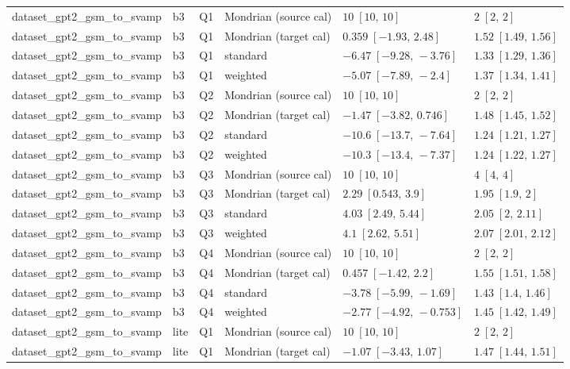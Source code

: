\begin{longtable}{@{}p{}p{}p{}p{}p{}p{}@{}}
dataset\_gpt2\_gsm\_to\_svamp & b3 & Q1 & Mondrian (source cal) & $10\;[10,\,10]$ & $2\;[2,\,2]$ \\
dataset\_gpt2\_gsm\_to\_svamp & b3 & Q1 & Mondrian (target cal) & $0.359\;[-1.93,\,2.48]$ & $1.52\;[1.49,\,1.56]$ \\
dataset\_gpt2\_gsm\_to\_svamp & b3 & Q1 & standard & $-6.47\;[-9.28,\,-3.76]$ & $1.33\;[1.29,\,1.36]$ \\
dataset\_gpt2\_gsm\_to\_svamp & b3 & Q1 & weighted & $-5.07\;[-7.89,\,-2.4]$ & $1.37\;[1.34,\,1.41]$ \\
dataset\_gpt2\_gsm\_to\_svamp & b3 & Q2 & Mondrian (source cal) & $10\;[10,\,10]$ & $2\;[2,\,2]$ \\
dataset\_gpt2\_gsm\_to\_svamp & b3 & Q2 & Mondrian (target cal) & $-1.47\;[-3.82,\,0.746]$ & $1.48\;[1.45,\,1.52]$ \\
dataset\_gpt2\_gsm\_to\_svamp & b3 & Q2 & standard & $-10.6\;[-13.7,\,-7.64]$ & $1.24\;[1.21,\,1.27]$ \\
dataset\_gpt2\_gsm\_to\_svamp & b3 & Q2 & weighted & $-10.3\;[-13.4,\,-7.37]$ & $1.24\;[1.22,\,1.27]$ \\
dataset\_gpt2\_gsm\_to\_svamp & b3 & Q3 & Mondrian (source cal) & $10\;[10,\,10]$ & $4\;[4,\,4]$ \\
dataset\_gpt2\_gsm\_to\_svamp & b3 & Q3 & Mondrian (target cal) & $2.29\;[0.543,\,3.9]$ & $1.95\;[1.9,\,2]$ \\
dataset\_gpt2\_gsm\_to\_svamp & b3 & Q3 & standard & $4.03\;[2.49,\,5.44]$ & $2.05\;[2,\,2.11]$ \\
dataset\_gpt2\_gsm\_to\_svamp & b3 & Q3 & weighted & $4.1\;[2.62,\,5.51]$ & $2.07\;[2.01,\,2.12]$ \\
dataset\_gpt2\_gsm\_to\_svamp & b3 & Q4 & Mondrian (source cal) & $10\;[10,\,10]$ & $2\;[2,\,2]$ \\
dataset\_gpt2\_gsm\_to\_svamp & b3 & Q4 & Mondrian (target cal) & $0.457\;[-1.42,\,2.2]$ & $1.55\;[1.51,\,1.58]$ \\
dataset\_gpt2\_gsm\_to\_svamp & b3 & Q4 & standard & $-3.78\;[-5.99,\,-1.69]$ & $1.43\;[1.4,\,1.46]$ \\
dataset\_gpt2\_gsm\_to\_svamp & b3 & Q4 & weighted & $-2.77\;[-4.92,\,-0.753]$ & $1.45\;[1.42,\,1.49]$ \\
dataset\_gpt2\_gsm\_to\_svamp & lite & Q1 & Mondrian (source cal) & $10\;[10,\,10]$ & $2\;[2,\,2]$ \\
dataset\_gpt2\_gsm\_to\_svamp & lite & Q1 & Mondrian (target cal) & $-1.07\;[-3.43,\,1.07]$ & $1.47\;[1.44,\,1.51]$ \\

\end{longtable}
